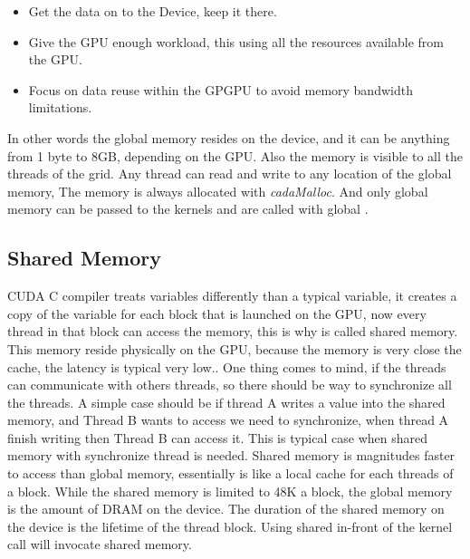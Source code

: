 \begin{itemize}
\item Get the data on to the Device, keep it there.
\item Give the GPU enough workload, this using all the resources available from the GPU.
\item Focus on data reuse within the GPGPU to avoid memory bandwidth limitations.
\end{itemize}

In other words the global memory resides on the device, and it can be anything from 1 byte to 8GB, depending on the GPU. Also the memory is visible to all the threads of the grid. Any thread can read and write to any location of the global memory, The memory is always allocated with \textit{cadaMalloc}. And only global memory can be passed to the kernels and are called with \twoline global \twoline. \cite{design}




\subsection{Shared Memory}

CUDA C compiler treats variables differently than a typical variable, it creates a copy of the variable for each block that is launched on the GPU, now every thread in that block can access the memory, this is why is called shared memory. This memory reside physically on the GPU, because the memory is very close the cache, the latency is typical very low.\cite{example}. One thing comes to mind, if the threads can communicate with others threads, so there should be way to synchronize all the threads. A simple case should be if thread A writes a value into the shared memory, and Thread B wants to access we need to synchronize, when thread A finish writing then Thread B can access it. This is typical case when shared memory with synchronize thread is needed. \cite{cook}
Shared memory is magnitudes faster to access than global memory, essentially is like a local cache for each threads of a block. While  the shared memory is limited to 48K a block, the global memory is the amount of DRAM on the device. The duration of the shared memory on the device is the lifetime of the thread block. Using \twoline shared \twoline in-front of the kernel call will invocate shared memory.


